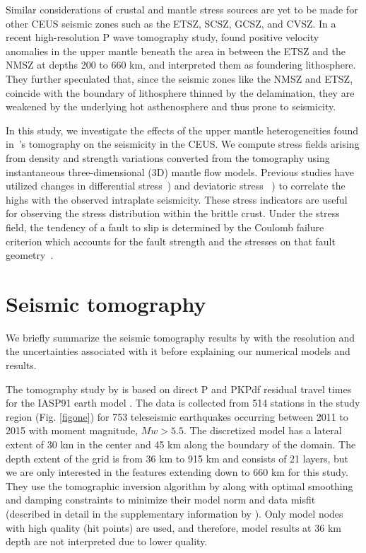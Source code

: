 \documentclass[draft,linenumbers]{agujournal2018}
\begin{document}
     Similar considerations of crustal and mantle stress sources are yet to be made for other CEUS seismic zones such as the ETSZ, SCSZ, GCSZ, and CVSZ. In a recent high-resolution P wave tomography study, \citet{Biryol_2016} found positive velocity anomalies in the upper mantle beneath the area in between the ETSZ and the NMSZ at depths 200 to 660 km, and interpreted them as foundering lithosphere. They further speculated that, since the seismic zones like the NMSZ and ETSZ, coincide with the boundary of lithosphere thinned by the delamination, they are weakened by the underlying hot asthenosphere and thus prone to seismicity. 
    
    In this study, we investigate the effects of the upper mantle heterogeneities found in~\citet{Biryol_2016}'s tomography on the seismicity in the CEUS. We compute stress fields arising from density and strength variations converted from the tomography using instantaneous three-dimensional (3D) mantle flow models. %
Previous studies have utilized changes in differential stress~\citep[e.g.,][]{baird2010relationship, zhan2016stress}) and deviatoric stress ~\citep[e.g.,][]{levandowski2016dense}) to correlate the highs with the observed intraplate seismicity. These stress indicators are useful for  observing the stress distribution within the brittle crust. Under the stress field, the tendency of a fault to slip is determined by the Coulomb failure criterion which accounts for the fault strength and the stresses on that fault geometry~\citep{king1994static, freed2005earthquake, li2007stress}. 

\section{Seismic tomography}
We briefly summarize the seismic tomography results by \citet{Biryol_2016} with the resolution and the uncertainties associated with it before explaining our numerical models and results.

    The tomography study by \citet{Biryol_2016} is based on direct P and PKPdf residual travel times for the IASP91 earth model \citep{kennett1991traveltimes}. The data is collected from 514 stations in the study region (Fig. \ref{figone}) for 753 teleseismic earthquakes occurring between 2011 to 2015 with moment magnitude, $Mw > 5.5$. The discretized model has a lateral extent of 30 km in the center and 45 km along the boundary of the domain. The depth extent of the grid is from 36 km to 915 km and consists of 21 layers, but we are only interested in the features extending down to 660 km for this study. They use the tomographic inversion algorithm by \citet{schmandt2010seismic} along with optimal smoothing and damping constraints to minimize their model norm and data misfit (described in detail in the supplementary information by \citet{Biryol_2016}). Only model nodes with high quality (hit points) are used, and therefore, model results at 36 km depth are not interpreted due to lower quality.
    
\end{document}

